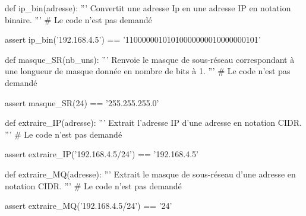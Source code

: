 \documentclass[11pt, a4paper]{report}
\begin{document}
   \begin{CodePythontexAlt}[TaillePolice=\large, Largeur=1\linewidth,Centre,Lignes=true,PremLigne=1]{}
def ip_bin(adresse):
    ''' Convertit une adresse Ip en une adresse IP en notation binaire. '''
    # Le code n'est pas demandé

assert ip_bin('192.168.4.5') == '11000000101010000000010000000101'

def masque_SR(nb_uns):
    ''' Renvoie le masque de sous-réseau correspondant 
    à une longueur de masque donnée en nombre de bits à 1. '''
    # Le code n'est pas demandé
    
assert masque_SR(24) == '255.255.255.0'

def extraire_IP(adresse):
    ''' Extrait l'adresse IP d'une adresse en notation CIDR. '''        
    # Le code n'est pas demandé

assert extraire_IP('192.168.4.5/24') == '192.168.4.5'

def extraire_MQ(adresse):
    ''' Extrait le masque de sous-réseau d'une adresse en notation CIDR. '''
    # Le code n'est pas demandé

assert extraire_MQ('192.168.4.5/24') == '24'
   \end{CodePythontexAlt}



   \thispagestyle{DS_LP}
\end{document}
